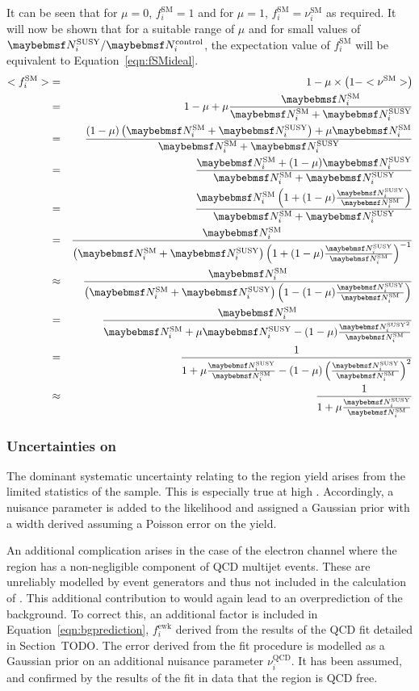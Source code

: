 It can be seen that for $\mu=0$, $f^{\textrm{SM}}_i=1$ and for $\mu=1$,
$f^{\textrm{SM}}_i=\nu^{\textrm{SM}}_i$ as required. It will now be shown that
for a suitable range of $\mu$ and for small values of $\NSUSYi/\NControli$, the
expectation value of $f^{\textrm{SM}}_i$ will be equivalent to
Equation~\ref{eqn:fSMideal}.
\begin{eqnarray*}
<f^{\textrm{SM}}_i> &=& 1 - \mu \times \left(1-<\nu^{\textrm{SM}}>\right) \\
                  &=& 1 - \mu  + \mu\frac{\NSMi}{\NSMi + \NSUSYi} \\
                  &=& \frac{(1-\mu)\left(\NSMi + \NSUSYi\right) + \mu\NSMi}{\NSMi + \NSUSYi} \\
                  &=& \frac{\NSMi + (1 - \mu)\NSUSYi}{\NSMi + \NSUSYi} \\
                  &=& \frac{\NSMi \left( 1 + (1-\mu)\frac{\NSUSYi}{\NSMi}\right)}{\NSMi + \NSUSYi} \\
                  &=& \frac{\NSMi}{\left(\NSMi +\NSUSYi\right)\left( 1 + (1 - \mu)\frac{\NSUSYi}{\NSMi}\right)^{-1}} \\
                  &\approx& \frac{\NSMi}{\left(\NSMi +\NSUSYi\right)\left( 1 - (1-\mu)\frac{\NSUSYi}{\NSMi}\right)} \\
                  &=& \frac{\NSMi}{\NSMi + \mu\NSUSYi - (1-\mu)\frac{\NSUSYi^2}{\NSMi}}\\
                  &=& \frac{1}{1 + \mu\frac{\NSUSYi}{\NSMi} - (1-\mu)\left(\frac{\NSUSYi}{\NSMi}\right)^2} \\
                  &\approx& \frac{1}{1 + \mu\frac{\NSUSYi}{\NSMi}}
\end{eqnarray*}

\subsubsection{Uncertainties on \NControli}
The dominant systematic uncertainty relating to the \LPcontrol region yield
arises from the limited statistics of the sample. This is especially true at
high \STlep. Accordingly, a nuisance parameter is added to the likelihood and
assigned a Gaussian prior with a width derived assuming a Poisson error on the
\NControli yield.

An additional complication arises in the case of the electron channel where the
\LPcontrol region has a non-negligible component of \ac{QCD} multijet
events. These are unreliably modelled by event generators and thus not included
in the calculation of \RCSi. This additional contribution to \NControli would
again lead to an overprediction of the background. To correct this, an
additional factor is included in Equation~\ref{eqn:bgprediction},
$f^{\textrm{ewk}}_i$ derived from the results of the \ac{QCD} fit detailed in
Section~TODO. The error derived from the fit procedure is modelled as a
Gaussian prior on an additional nuisance parameter $\nu^{\textrm{QCD}}_i$. It
has been assumed, and confirmed by the results of the fit in data that the
region \LPsignal is \ac{QCD} free.

